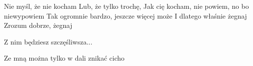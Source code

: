 \documentclass[../../../songbook.tex]{subfiles}
\begin{document}
Nie myśl, że nie kocham											 \newline
Lub, że tylko trochę,												 \newline					
Jak cię kocham, nie powiem, no bo niewypowiem												 \newline
Tak ogromnie bardzo, jeszcze więcej może												 \newline	
I dlatego właśnie żegnaj													 \newline			
Zrozum dobrze, żegnaj													 \newline				

\-\hspace{1cm} Z nim będziesz szczęśliwsza...											 \newline

Ze mną można tylko w dali znikać cicho		  \newline	
\end{document}
